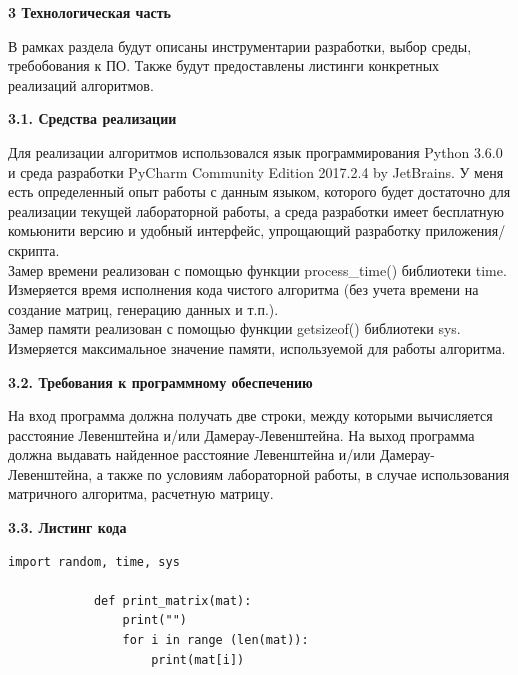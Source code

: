 \documentclass[a4paper,12pt]{report}
\begin{document}
    \newpage

    \begin{center}
        \textbf{3 Технологическая часть}
        \label{sec:tecnologic_part}
		\begin{flushleft}
			В рамках раздела будут описаны инструментарии разработки, выбор среды, требобования к ПО. Также будут предоставлены листинги конкретных реализаций алгоритмов.
		\end{flushleft}
	
        \textbf{3.1. Средства реализации}
        \begin{flushleft}
        	Для реализации алгоритмов использовался язык программирования Python 3.6.0 и среда разработки PyCharm Community Edition 2017.2.4 by JetBrains. У меня есть определенный опыт работы с данным языком, которого будет достаточно для реализации текущей лабораторной работы, а среда разработки имеет бесплатную комьюнити версию и удобный интерфейс, упрощающий разработку приложения/скрипта.\\
        	Замер времени реализован с помощью функции process\_time() библиотеки time.
        	Измеряется время исполнения кода чистого алгоритма (без учета времени на создание матриц, генерацию данных и т.п.).\\
        	Замер памяти реализован с помощью функции getsizeof() библиотеки sys.
        	Измеряется максимальное значение памяти, используемой для работы алгоритма.
       	\end{flushleft}

		\textbf{3.2. Требования к программному обеспечению}
		\begin{flushleft}
			На вход программа должна получать две строки, между которыми вычисляется расстояние Левенштейна и/или Дамерау-Левенштейна. На выход программа должна выдавать найденное расстояние Левенштейна и/или Дамерау-Левенштейна, а также по условиям лабораторной работы, в случае использования матричного алгоритма, расчетную матрицу.
		\end{flushleft}

		\textbf{3.3. Листинг кода}
        \begin{flushleft}	
	        \begin{lstlisting}[frame = single, breaklines, caption = Листинг вспомогательных функций и объявлений]
	        import random, time, sys
	        
	        def print_matrix(mat):
	        	print("")
	        	for i in range (len(mat)):
	        		print(mat[i])
	        

\end{lstlisting}
\end{flushleft}
\end{center}
\end{document}

